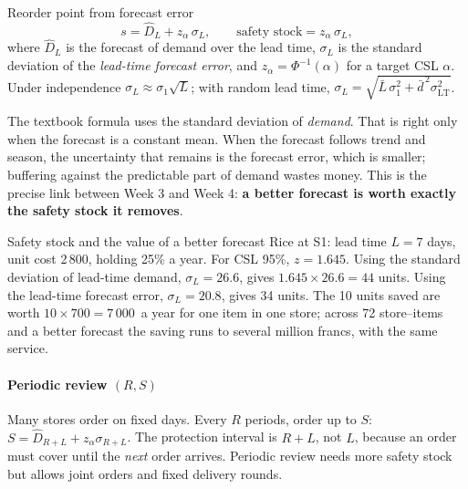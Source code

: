 \begin{keyformula}{Reorder point from forecast error}
\[ s=\hat D_L + z_\alpha\,\sigma_L,\qquad \text{safety stock}=z_\alpha\,\sigma_L, \]
where $\hat D_L$ is the forecast of demand over the lead time, $\sigma_L$ is the standard deviation of the
\emph{lead-time forecast error}, and $z_\alpha=\Phi^{-1}(\alpha)$ for a target CSL $\alpha$. Under independence
$\sigma_L\approx\sigma_1\sqrt L$; with random lead time,
$\sigma_L=\sqrt{\bar L\,\sigma_1^2+\bar d^{\,2}\sigma_{\text{LT}}^2}$.
\end{keyformula}

The textbook formula uses the standard deviation of \emph{demand}. That is right only when the forecast is a constant
mean. When the forecast follows trend and season, the uncertainty that remains is the forecast error, which is
smaller; buffering against the predictable part of demand wastes money. This is the precise link between Week 3 and
Week 4: \textbf{a better forecast is worth exactly the safety stock it removes}.

\begin{example}{Safety stock and the value of a better forecast}
Rice at S1: lead time $L=7$ days, unit cost 2\,800\xaf, holding 25\% a year. For CSL 95\%, $z=1.645$. Using the standard
deviation of lead-time demand, $\sigma_L=26.6$, gives $1.645\times26.6=44$ units. Using the lead-time forecast error,
$\sigma_L=20.8$, gives 34 units. The 10 units saved are worth $10\times700=7\,000$\xaf\ a year for one item in one store;
across 72 store--items and a better forecast the saving runs to several million francs, with the same service.
\end{example}

\paragraph{Periodic review $(R,S)$} Many stores order on fixed days. Every $R$ periods, order up to $S$:
$S=\hat D_{R+L}+z_\alpha\sigma_{R+L}$. The protection interval is $R+L$, not $L$, because an order must cover until the
\emph{next} order arrives. Periodic review needs more safety stock but allows joint orders and fixed delivery rounds.

